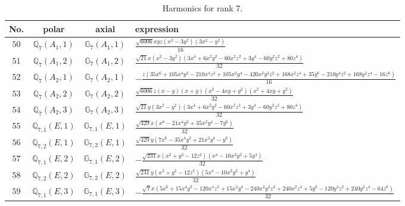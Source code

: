 \documentclass[fleqn,8pt,landscape]{jsarticle}
\begin{document}
\begin{table}[ht!]
\begin{center}
\caption{Harmonics for rank 7.}
\renewcommand{\arraystretch}{1.3}
\begin{tabular}{cccl} \hline \hline
No. & polar & axial & expression \\ \hline
$ 50 $ & $ \mathbb{Q}_{7}(A_{1},1) $ & $ \mathbb{G}_{7}(A_{1},1) $ & $ \frac{\sqrt{6006} x y z \left(x^{2} - 3 y^{2}\right) \left(3 x^{2} - y^{2}\right)}{16} $ \\
$ 51 $ & $ \mathbb{Q}_{7}(A_{1},2) $ & $ \mathbb{G}_{7}(A_{1},2) $ & $ \frac{\sqrt{21} x \left(x^{2} - 3 y^{2}\right) \left(3 x^{4} + 6 x^{2} y^{2} - 60 x^{2} z^{2} + 3 y^{4} - 60 y^{2} z^{2} + 80 z^{4}\right)}{32} $ \\
$ 52 $ & $ \mathbb{Q}_{7}(A_{2},1) $ & $ \mathbb{G}_{7}(A_{2},1) $ & $ - \frac{z \left(35 x^{6} + 105 x^{4} y^{2} - 210 x^{4} z^{2} + 105 x^{2} y^{4} - 420 x^{2} y^{2} z^{2} + 168 x^{2} z^{4} + 35 y^{6} - 210 y^{4} z^{2} + 168 y^{2} z^{4} - 16 z^{6}\right)}{16} $ \\
$ 53 $ & $ \mathbb{Q}_{7}(A_{2},2) $ & $ \mathbb{G}_{7}(A_{2},2) $ & $ \frac{\sqrt{6006} z \left(x - y\right) \left(x + y\right) \left(x^{2} - 4 x y + y^{2}\right) \left(x^{2} + 4 x y + y^{2}\right)}{32} $ \\
$ 54 $ & $ \mathbb{Q}_{7}(A_{2},3) $ & $ \mathbb{G}_{7}(A_{2},3) $ & $ \frac{\sqrt{21} y \left(3 x^{2} - y^{2}\right) \left(3 x^{4} + 6 x^{2} y^{2} - 60 x^{2} z^{2} + 3 y^{4} - 60 y^{2} z^{2} + 80 z^{4}\right)}{32} $ \\
$ 55 $ & $ \mathbb{Q}_{7,1}(E,1) $ & $ \mathbb{G}_{7,1}(E,1) $ & $ \frac{\sqrt{429} x \left(x^{6} - 21 x^{4} y^{2} + 35 x^{2} y^{4} - 7 y^{6}\right)}{32} $ \\
$ 56 $ & $ \mathbb{Q}_{7,2}(E,1) $ & $ \mathbb{G}_{7,2}(E,1) $ & $ \frac{\sqrt{429} y \left(7 x^{6} - 35 x^{4} y^{2} + 21 x^{2} y^{4} - y^{6}\right)}{32} $ \\
$ 57 $ & $ \mathbb{Q}_{7,1}(E,2) $ & $ \mathbb{G}_{7,1}(E,2) $ & $ - \frac{\sqrt{231} x \left(x^{2} + y^{2} - 12 z^{2}\right) \left(x^{4} - 10 x^{2} y^{2} + 5 y^{4}\right)}{32} $ \\
$ 58 $ & $ \mathbb{Q}_{7,2}(E,2) $ & $ \mathbb{G}_{7,2}(E,2) $ & $ \frac{\sqrt{231} y \left(x^{2} + y^{2} - 12 z^{2}\right) \left(5 x^{4} - 10 x^{2} y^{2} + y^{4}\right)}{32} $ \\
$ 59 $ & $ \mathbb{Q}_{7,1}(E,3) $ & $ \mathbb{G}_{7,1}(E,3) $ & $ - \frac{\sqrt{7} x \left(5 x^{6} + 15 x^{4} y^{2} - 120 x^{4} z^{2} + 15 x^{2} y^{4} - 240 x^{2} y^{2} z^{2} + 240 x^{2} z^{4} + 5 y^{6} - 120 y^{4} z^{2} + 240 y^{2} z^{4} - 64 z^{6}\right)}{32} $ \\

\end{tabular}
\end{center}
\end{table}
\end{document}
